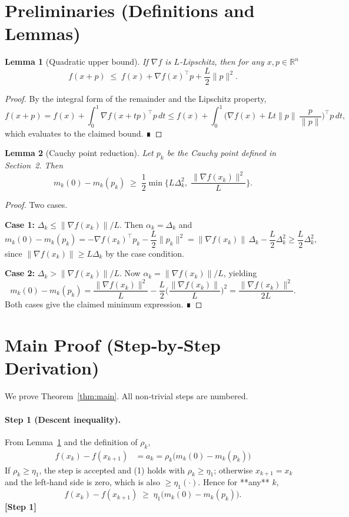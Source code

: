 \documentclass{article}
\newtheorem{lemma}{Lemma}
\begin{document}
\section*{Preliminaries (Definitions and Lemmas)}
\begin{lemma}[Quadratic upper bound]\label{lem:upper}
If $\nabla f$ is $L$‑Lipschitz, then for any $x,p\in\mathbb{R}^n$
\[
f(x+p)\;\le\; f(x)+\nabla f(x)^{\!\top}p+\frac{L}{2}\|p\|^2 .
\]
\end{lemma}
\begin{proof}
By the integral form of the remainder and the Lipschitz property,
\[
f(x+p)=f(x)+\int_0^1\nabla f(x+tp)^{\!\top}p\,dt
\le f(x)+\int_0^1\big(\nabla f(x)+Lt\|p\|\,\frac{p}{\|p\|}\big)^{\!\top}p\,dt,
\]
which evaluates to the claimed bound. ∎
\end{proof}
\begin{lemma}[Cauchy point reduction]\label{lem:cauchy}
Let $p_k$ be the Cauchy point defined in Section~2. Then
\[
m_k(0)-m_k(p_k)\;\ge\;\frac{1}{2}\min\!\Big\{L\Delta_k^2,\;\frac{\|\nabla f(x_k)\|^2}{L}\Big\}.
\]
\end{lemma}
\begin{proof}
Two cases.

\noindent\textbf{Case 1:} $\Delta_k\le \|\nabla f(x_k)\|/L$.  
Then $\alpha_k=\Delta_k$ and
\[
m_k(0)-m_k(p_k)= -\nabla f(x_k)^{\!\top}p_k-\frac{L}{2}\|p_k\|^2
= \|\nabla f(x_k)\|\,\Delta_k-\frac{L}{2}\Delta_k^2
\ge \frac{L}{2}\Delta_k^2,
\]
since $\|\nabla f(x_k)\|\ge L\Delta_k$ by the case condition.

\noindent\textbf{Case 2:} $\Delta_k> \|\nabla f(x_k)\|/L$.  
Now $\alpha_k=\|\nabla f(x_k)\|/L$, yielding
\[
m_k(0)-m_k(p_k)=\frac{\|\nabla f(x_k)\|^2}{L}-\frac{L}{2}\Big(\frac{\|\nabla f(x_k)\|}{L}\Big)^2
=\frac{\|\nabla f(x_k)\|^2}{2L}.
\]
Both cases give the claimed minimum expression. ∎
\end{proof}

\section*{Main Proof (Step‑by‑Step Derivation)}
We prove Theorem~\ref{thm:main}.  All non‑trivial steps are numbered.

\paragraph{Step 1 (Descent inequality).}  
From Lemma~\ref{lem:upper} and the definition of $\rho_k$,
\[
\begin{aligned}
f(x_k)-f(x_{k+1})
&= a_k
= \rho_k\big(m_k(0)-m_k(p_k)\big)                               \tag{1}
\end{aligned}
\]
If $\rho_k\ge\eta_1$, the step is accepted and (1) holds with $\rho_k\ge\eta_1$;
otherwise $x_{k+1}=x_k$ and the left‑hand side is zero, which is also $\ge\eta_1(\cdot)$.  
Hence for **any** $k$,
\[
f(x_k)-f(x_{k+1})\;\ge\;\eta_1\big(m_k(0)-m_k(p_k)\big).           \tag{2}
\]
\textbf{[Step 1]}
\end{document}
